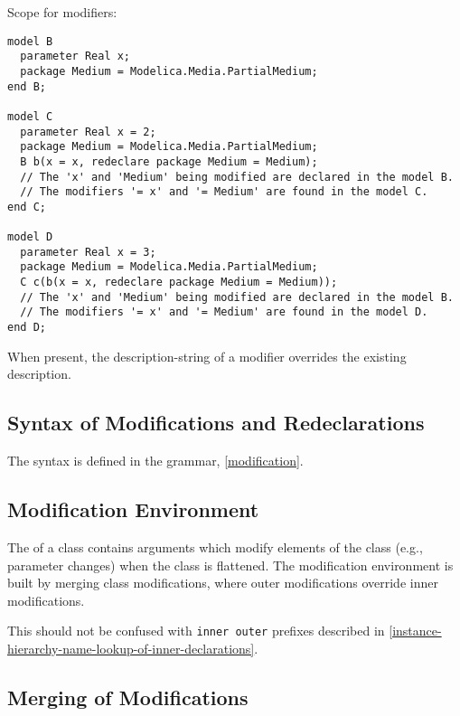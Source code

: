 \begin{example}
Scope for modifiers:
\begin{lstlisting}[language=modelica]
model B
  parameter Real x;
  package Medium = Modelica.Media.PartialMedium;
end B;

model C
  parameter Real x = 2;
  package Medium = Modelica.Media.PartialMedium;
  B b(x = x, redeclare package Medium = Medium);
  // The 'x' and 'Medium' being modified are declared in the model B.
  // The modifiers '= x' and '= Medium' are found in the model C.
end C;

model D
  parameter Real x = 3;
  package Medium = Modelica.Media.PartialMedium;
  C c(b(x = x, redeclare package Medium = Medium));
  // The 'x' and 'Medium' being modified are declared in the model B.
  // The modifiers '= x' and '= Medium' are found in the model D.
end D;
\end{lstlisting}
\end{example}

When present, the description-string of a modifier overrides the existing description.


\subsection{Syntax of Modifications and Redeclarations}\label{syntax-of-modifications-and-redeclarations}

The syntax is defined in the grammar, \cref{modification}.


\subsection{Modification Environment}\label{modification-environment}

The  of a class contains arguments which modify elements of the class (e.g., parameter changes) when the class is flattened.
The modification environment is built by merging class modifications, where outer modifications override inner modifications.

\begin{nonnormative}
This should not be confused with \lstinline!inner outer! prefixes described in \cref{instance-hierarchy-name-lookup-of-inner-declarations}.
\end{nonnormative}


\subsection{Merging of Modifications}\label{merging-of-modifications}

